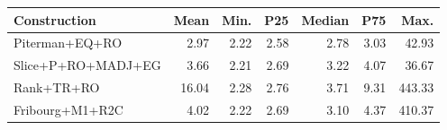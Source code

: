 \begin{tabular}{lrrrrrr}
  \hline
Construction & Mean & Min. & P25 & Median & P75 & Max. \\ 
  \hline
Piterman+EQ+RO & 2.97 & 2.22 & 2.58 & 2.78 & 3.03 & 42.93 \\ 
  Slice+P+RO+MADJ+EG & 3.66 & 2.21 & 2.69 & 3.22 & 4.07 & 36.67 \\ 
  Rank+TR+RO & 16.04 & 2.28 & 2.76 & 3.71 & 9.31 & 443.33 \\ 
  Fribourg+M1+R2C & 4.02 & 2.22 & 2.69 & 3.10 & 4.37 & 410.37 \\ 
   \hline
\end{tabular}
